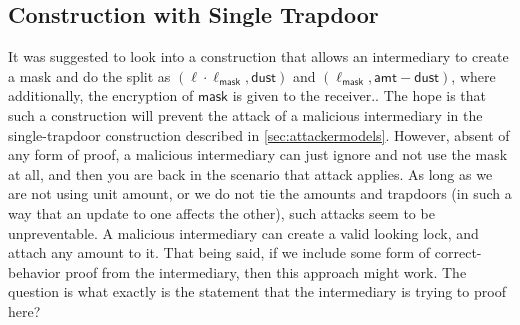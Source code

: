\subsection{Construction with Single Trapdoor}

It was suggested to look into a construction that allows an intermediary to create a mask and 
do the split as $(\ell \cdot \ell_\mathsf{mask}, \mathsf{dust})$ and $(\ell_\mathsf{mask}, 
\mathsf{amt}-\mathsf{dust})$, where additionally, the encryption of $\mathsf{mask}$ is given to 
the receiver.. The hope is that such a construction will prevent the attack of a malicious 
intermediary in the single-trapdoor construction described in \cref{sec:attackermodels}. 
However, absent of any form of proof, a malicious intermediary can just ignore and not use the 
mask at all, and then you are back in the scenario that attack applies. As long as we are not 
using unit amount, or we do not tie the amounts and trapdoors (in such a way that an update to 
one affects the other), such attacks seem to be unpreventable. A malicious intermediary can 
create a valid looking lock, and attach any amount to it. That being said, if we include some 
form of correct-behavior proof from the intermediary, then this approach might work. The 
question is what exactly is the statement that the intermediary is trying to proof here?

\clearpage